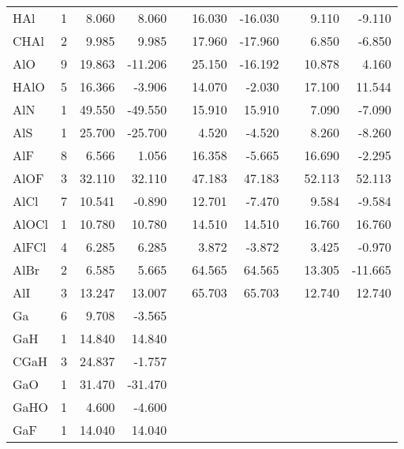 \begin{table}
\begin{center}
\begin{tabular}{lrrrrrrrrr}
      HAl     &      1 &    8.060 &    8.060 &  &   16.030 &  -16.030 &  &    9.110 &   -9.110 \\
      CHAl    &      2 &    9.985 &    9.985 &  &   17.960 &  -17.960 &  &    6.850 &   -6.850 \\
      AlO     &      9 &   19.863 &  -11.206 &  &   25.150 &  -16.192 &  &   10.878 &    4.160 \\
      HAlO    &      5 &   16.366 &   -3.906 &  &   14.070 &   -2.030 &  &   17.100 &   11.544 \\
      AlN     &      1 &   49.550 &  -49.550 &  &   15.910 &   15.910 &  &    7.090 &   -7.090 \\
      AlS     &      1 &   25.700 &  -25.700 &  &    4.520 &   -4.520 &  &    8.260 &   -8.260 \\
      AlF     &      8 &    6.566 &    1.056 &  &   16.358 &   -5.665 &  &   16.690 &   -2.295 \\
      AlOF    &      3 &   32.110 &   32.110 &  &   47.183 &   47.183 &  &   52.113 &   52.113 \\
      AlCl    &      7 &   10.541 &   -0.890 &  &   12.701 &   -7.470 &  &    9.584 &   -9.584 \\
      AlOCl   &      1 &   10.780 &   10.780 &  &   14.510 &   14.510 &  &   16.760 &   16.760 \\
      AlFCl   &      4 &    6.285 &    6.285 &  &    3.872 &   -3.872 &  &    3.425 &   -0.970 \\
      AlBr    &      2 &    6.585 &    5.665 &  &   64.565 &   64.565 &  &   13.305 &  -11.665 \\
      AlI     &      3 &   13.247 &   13.007 &  &   65.703 &   65.703 &  &   12.740 &   12.740 \\
  Ga        &   6 &    9.708 &   -3.565 &     &          &          &     &          &          \\
  GaH       &   1 &   14.840 &   14.840 &     &          &          &     &          &          \\
  CGaH      &   3 &   24.837 &   -1.757 &     &          &          &     &          &          \\
  GaO       &   1 &   31.470 &  -31.470 &     &          &          &     &          &          \\
  GaHO      &   1 &    4.600 &   -4.600 &     &          &          &     &          &          \\
  GaF       &   1 &   14.040 &   14.040 &     &          &          &     &          &          \\

\end{tabular}
\end{center}
\end{table}
